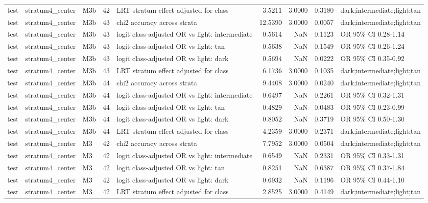 \begin{tabular}{lllrlrrrl}
test & stratum4\_center & M3b & 42 & LRT stratum effect adjusted for class & 3.5211 & 3.0000 & 0.3180 & dark;intermediate;light;tan \\
test & stratum4\_center & M3b & 43 & chi2 accuracy across strata & 12.5390 & 3.0000 & 0.0057 & dark;intermediate;light;tan \\
test & stratum4\_center & M3b & 43 & logit class-adjusted OR vs light: intermediate & 0.5614 & NaN & 0.1123 & OR 95\% CI 0.28-1.14 \\
test & stratum4\_center & M3b & 43 & logit class-adjusted OR vs light: tan & 0.5638 & NaN & 0.1549 & OR 95\% CI 0.26-1.24 \\
test & stratum4\_center & M3b & 43 & logit class-adjusted OR vs light: dark & 0.5694 & NaN & 0.0222 & OR 95\% CI 0.35-0.92 \\
test & stratum4\_center & M3b & 43 & LRT stratum effect adjusted for class & 6.1736 & 3.0000 & 0.1035 & dark;intermediate;light;tan \\
test & stratum4\_center & M3b & 44 & chi2 accuracy across strata & 9.4408 & 3.0000 & 0.0240 & dark;intermediate;light;tan \\
test & stratum4\_center & M3b & 44 & logit class-adjusted OR vs light: intermediate & 0.6497 & NaN & 0.2261 & OR 95\% CI 0.32-1.31 \\
test & stratum4\_center & M3b & 44 & logit class-adjusted OR vs light: tan & 0.4829 & NaN & 0.0483 & OR 95\% CI 0.23-0.99 \\
test & stratum4\_center & M3b & 44 & logit class-adjusted OR vs light: dark & 0.8052 & NaN & 0.3719 & OR 95\% CI 0.50-1.30 \\
test & stratum4\_center & M3b & 44 & LRT stratum effect adjusted for class & 4.2359 & 3.0000 & 0.2371 & dark;intermediate;light;tan \\
test & stratum4\_center & M3 & 42 & chi2 accuracy across strata & 7.7952 & 3.0000 & 0.0504 & dark;intermediate;light;tan \\
test & stratum4\_center & M3 & 42 & logit class-adjusted OR vs light: intermediate & 0.6549 & NaN & 0.2331 & OR 95\% CI 0.33-1.31 \\
test & stratum4\_center & M3 & 42 & logit class-adjusted OR vs light: tan & 0.8251 & NaN & 0.6387 & OR 95\% CI 0.37-1.84 \\
test & stratum4\_center & M3 & 42 & logit class-adjusted OR vs light: dark & 0.6932 & NaN & 0.1196 & OR 95\% CI 0.44-1.10 \\
test & stratum4\_center & M3 & 42 & LRT stratum effect adjusted for class & 2.8525 & 3.0000 & 0.4149 & dark;intermediate;light;tan \\

\end{tabular}
